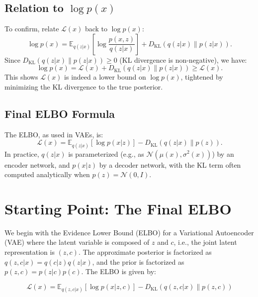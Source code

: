 \documentclass[12pt]{article}
\numberwithin{equation}{section}
\begin{document}
\subsection{Relation to \( \log p(x) \)}
To confirm, relate \( \mathcal{L}(x) \) back to \( \log p(x) \):
\begin{equation}
\log p(x) = \mathbb{E}_{q(z | x)} \left[ \log \frac{p(x, z)}{q(z | x)} \right] + D_{\text{KL}}(q(z | x) \| p(z | x)).
\end{equation}
Since \( D_{\text{KL}}(q(z | x) \| p(z | x)) \geq 0 \) (KL divergence is non-negative), we have:
\begin{equation}
\log p(x) = \mathcal{L}(x) + D_{\text{KL}}(q(z | x) \| p(z | x)) \geq \mathcal{L}(x).
\label{eq:log_p_x}
\end{equation}
This shows \( \mathcal{L}(x) \) is indeed a lower bound on \( \log p(x) \), tightened by minimizing the KL divergence to the true posterior.

\subsection{Final ELBO Formula}
The ELBO, as used in VAEs, is:
\begin{equation}
\mathcal{L}(x) = \mathbb{E}_{q(z | x)} \left[ \log p(x | z) \right] - D_{\text{KL}}(q(z | x) \| p(z)).
\label{eq:final_elbo}
\end{equation}
In practice, \( q(z | x) \) is parameterized (e.g., as \( \mathcal{N}(\mu(x), \sigma^2(x)) \)) by an encoder network, and \( p(x | z) \) by a decoder network, with the KL term often computed analytically when \( p(z) = \mathcal{N}(0, I) \).

\section{Starting Point: The Final ELBO}

We begin with the Evidence Lower Bound (ELBO) for a Variational Autoencoder (VAE) where the latent variable is composed of \( z \) and \( c \), i.e., the joint latent representation is \( (z, c) \). The approximate posterior is factorized as \( q(z, c | x) = q(c | z) q(z | x) \), and the prior is factorized as \( p(z, c) = p(z | c) p(c) \). The ELBO is given by:

\begin{equation}
\mathcal{L}(x) = \mathbb{E}_{q(z, c | x)} \left[ \log p(x | z, c) \right] - D_{\text{KL}}(q(z, c | x) \| p(z, c))
\label{eq:elbo_zc}
\end{equation}
\end{document}
